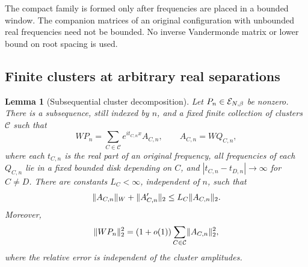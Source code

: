 \documentclass[11pt,a4paper]{article}
\numberwithin{equation}{section}
\newtheorem{lemma}[theorem]{Lemma}
\theoremstyle{definition}\newtheorem{definition}[theorem]{Definition}
\theoremstyle{remark}\newtheorem{remark}[theorem]{Remark}
\begin{document}
The compact family is formed only after frequencies are placed in a
bounded window. The companion matrices of an original configuration with
unbounded real frequencies need not be bounded. No inverse Vandermonde
matrix or lower bound on root spacing is used.

\subsection{Finite clusters at arbitrary real separations}\label{e:sec:clusters}

\begin{lemma}[Subsequential cluster decomposition]\label{e:lem:clusters}
Let $P_n\in\mathcal E_{N,\beta}$ be nonzero. There is a subsequence, still indexed by $n$,
and a fixed finite collection of clusters $\mathcal C$ such that
\begin{equation}\label{e:eq:cluster}
 WP_n=\sum_{C\in\mathcal C}e^{it_{C,n}x}A_{C,n},\qquad
 A_{C,n}=WQ_{C,n},
\end{equation}
where each $t_{C,n}$ is the real part of an original frequency,
all frequencies of each $Q_{C,n}$ lie in a fixed bounded disk depending
on $C$, and $|t_{C,n}-t_{D,n}|\to\infty$ for $C\ne D$.
There are constants $L_C<\infty$, independent of $n$, such that
\begin{equation}\label{e:eq:cluster-envelope}
 \lVert A_{C,n}\rVert_W+\lVert A_{C,n}'\rVert_2\le L_C\lVert A_{C,n}\rVert_2.
\end{equation}
Moreover,
\begin{equation}\label{e:eq:decouple}
 \lVert WP_n\rVert_2^2=(1+o(1))
 \sum_{C\in\mathcal C}\lVert A_{C,n}\rVert_2^2,
\end{equation}
where the relative error is independent of the cluster amplitudes.
\end{lemma}
\end{document}
